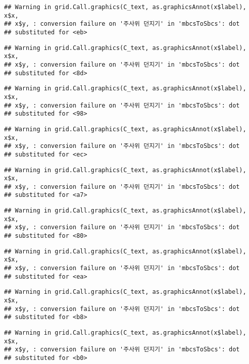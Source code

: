\documentclass[]{book}
\begin{document}
\begin{verbatim}
## Warning in grid.Call.graphics(C_text, as.graphicsAnnot(x$label), x$x,
## x$y, : conversion failure on '주사위 던지기' in 'mbcsToSbcs': dot
## substituted for <eb>
\end{verbatim}

\begin{verbatim}
## Warning in grid.Call.graphics(C_text, as.graphicsAnnot(x$label), x$x,
## x$y, : conversion failure on '주사위 던지기' in 'mbcsToSbcs': dot
## substituted for <8d>
\end{verbatim}

\begin{verbatim}
## Warning in grid.Call.graphics(C_text, as.graphicsAnnot(x$label), x$x,
## x$y, : conversion failure on '주사위 던지기' in 'mbcsToSbcs': dot
## substituted for <98>
\end{verbatim}

\begin{verbatim}
## Warning in grid.Call.graphics(C_text, as.graphicsAnnot(x$label), x$x,
## x$y, : conversion failure on '주사위 던지기' in 'mbcsToSbcs': dot
## substituted for <ec>
\end{verbatim}

\begin{verbatim}
## Warning in grid.Call.graphics(C_text, as.graphicsAnnot(x$label), x$x,
## x$y, : conversion failure on '주사위 던지기' in 'mbcsToSbcs': dot
## substituted for <a7>
\end{verbatim}

\begin{verbatim}
## Warning in grid.Call.graphics(C_text, as.graphicsAnnot(x$label), x$x,
## x$y, : conversion failure on '주사위 던지기' in 'mbcsToSbcs': dot
## substituted for <80>
\end{verbatim}

\begin{verbatim}
## Warning in grid.Call.graphics(C_text, as.graphicsAnnot(x$label), x$x,
## x$y, : conversion failure on '주사위 던지기' in 'mbcsToSbcs': dot
## substituted for <ea>
\end{verbatim}

\begin{verbatim}
## Warning in grid.Call.graphics(C_text, as.graphicsAnnot(x$label), x$x,
## x$y, : conversion failure on '주사위 던지기' in 'mbcsToSbcs': dot
## substituted for <b8>
\end{verbatim}

\begin{verbatim}
## Warning in grid.Call.graphics(C_text, as.graphicsAnnot(x$label), x$x,
## x$y, : conversion failure on '주사위 던지기' in 'mbcsToSbcs': dot
## substituted for <b0>
\end{verbatim}
\end{document}
